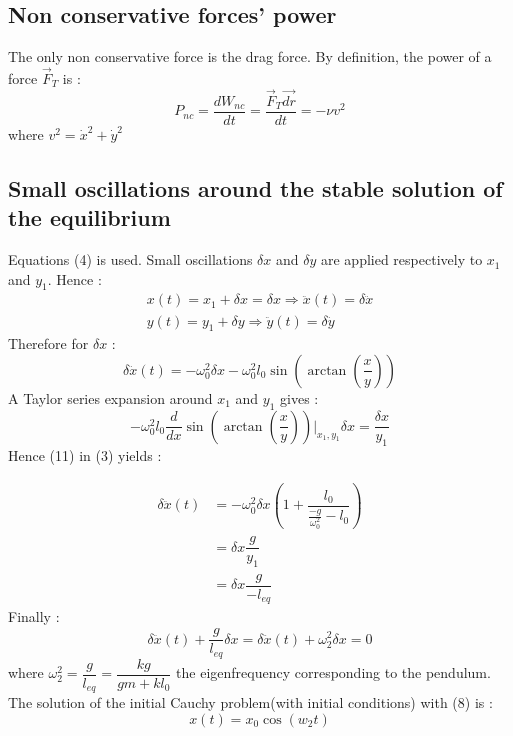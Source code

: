 \subsection{Non conservative forces' power}
	The only non conservative force is the drag force. By definition, the 			power of a force $\vec{F}_T$ is : 
	\begin{equation}
	P_{nc}=\dfrac{dW_{nc}}{dt} =\dfrac{\vec{F}_T\vec{dr}}{dt}=-\nu v^2
	\end{equation}
	where $v^2=\dot{x}^2 + \dot{y}^2$
\subsection{Small oscillations around the stable solution of the equilibrium}
	Equations (4) is used. Small oscillations $\delta x$ and $\delta y$ are 		applied respectively to $x_1$ and $y_1$. Hence : 
	\begin{gather}
	x(t)=x_1 + \delta x=\delta x \Rightarrow \ddot{x}(t)=\delta\ddot{x}\\
	y(t)=y_1 + \delta y \Rightarrow \ddot{y}(t)=\delta\ddot{y}
	\end{gather}
	Therefore for $\delta x$ : 
	\begin{equation}
	\delta\ddot{x}(t)=-\omega_0^2\delta x - \omega_0^2l_0\sin\left(\arctan\left(\dfrac{x}{y}\right)\right)
	\end{equation}
	A Taylor series expansion around  $x_1$ and $y_1$ gives : 
	\begin{equation}
	-\omega_0^2l_0\frac{d}{dx}\sin\left(\arctan\left(\dfrac{x}{y}\right)\right)\bigg\rvert_{x_1,y_1}\delta x = \frac{\delta x}{y_1}
	\end{equation}
	Hence (11) in (3) yields : 

	\begin{align*}
	\delta\ddot{x}(t)&=-\omega_0^2\delta x\left(1+\dfrac{l_0}{\frac{-g}{\omega_0^2}-l_0}\right)\\
	&=\delta x \dfrac{g}{y_1}\\
	&=\delta x \dfrac{g}{-l_{eq}}
	\end{align*}
	Finally : 
	\begin{equation}
	\delta \ddot{x}(t)+\dfrac{g}{l_{eq}}\delta x=\delta \ddot{x}(t)+\omega_2^2\delta x=0
	\end{equation}
	where $\omega_2^2=\dfrac{g}{l_{eq}}=\dfrac{kg}{gm+kl_0}$ the eigenfrequency corresponding to the pendulum. The solution of the initial Cauchy problem(with initial conditions) with (8) is : 
	\begin{equation}
		x(t)=x_0\cos(w_2t)
	\end{equation} 
	
